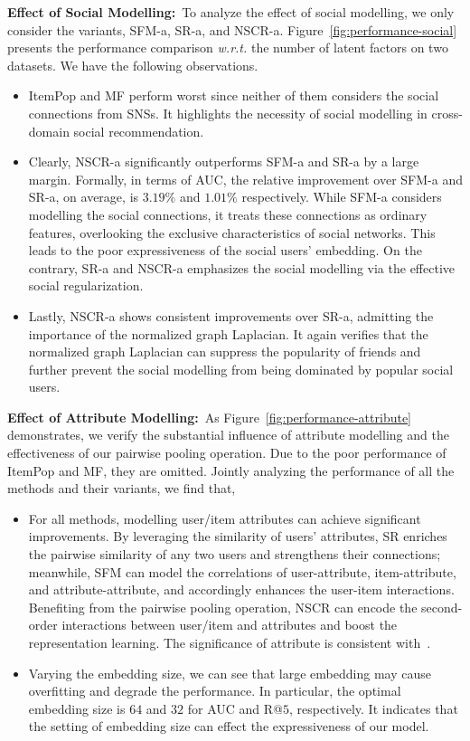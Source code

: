 \documentclass[sigconf]{acmart}
\newcommand{\wrt}{\emph{w.r.t. }}
\begin{document}
	\textbf{Effect of Social Modelling:}~To analyze the effect of social modelling, we only consider the variants, SFM-a, SR-a, and NSCR-a. Figure~\ref{fig:performance-social} presents the performance comparison \wrt the number of latent factors on two datasets. We have the following observations.
	\begin{itemize}[leftmargin=*]
		\item ItemPop and MF perform worst since neither of them considers the social connections from SNSs. It highlights the necessity of social modelling in cross-domain social recommendation.
		\item Clearly, NSCR-a significantly outperforms SFM-a and SR-a by a large margin. Formally, in terms of AUC, the relative improvement over SFM-a and SR-a, on average, is $3.19\%$ and $1.01\%$ respectively. While SFM-a considers modelling the social connections, it treats these connections as ordinary features, overlooking the exclusive characteristics of social networks. This leads to the poor expressiveness of the social users' embedding. On the contrary, SR-a and NSCR-a emphasizes the social modelling via the effective social regularization.
		\item Lastly, NSCR-a shows consistent improvements over SR-a, admitting the importance of the normalized graph Laplacian. It again verifies that the normalized graph Laplacian can suppress the popularity of friends and further prevent the social modelling from being dominated by popular social users.
	\end{itemize}
	
	\textbf{Effect of Attribute Modelling:}~As Figure~\ref{fig:performance-attribute} demonstrates, we verify the substantial influence of attribute modelling and the effectiveness of our pairwise pooling operation. Due to the poor performance of ItemPop and MF, they are omitted. Jointly analyzing the performance of all the methods and their variants, we find that,
	\begin{itemize}[leftmargin=*]
		\item For all methods, modelling user/item attributes can achieve significant improvements. By leveraging the similarity of users' attributes, SR enriches the pairwise similarity of any two users and strengthens their connections; meanwhile, SFM can model the correlations of user-attribute, item-attribute, and attribute-attribute, and accordingly enhances the user-item interactions. Benefiting from the pairwise pooling operation, NSCR can encode the second-order interactions between user/item and attributes and boost the representation learning. The significance of attribute is consistent with~\cite{DBLP:conf/mm/ZhangZYYGC13}.
		\item Varying the embedding size, we can see that large embedding may cause overfitting and degrade the performance. In particular, the optimal embedding size is $64$ and $32$ for AUC and R@$5$, respectively. It indicates that the setting of embedding size can effect the expressiveness of our model.
	\end{itemize}
	
\end{document}
